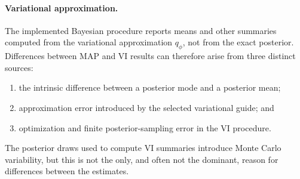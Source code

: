 \paragraph{Variational approximation.}
The implemented Bayesian procedure reports means and other summaries computed from
the variational approximation $q_\phi$, not from the exact posterior. Differences
between MAP and VI results can therefore arise from three distinct sources:
\begin{enumerate}
\item the intrinsic difference between a posterior mode and a posterior mean;
\item approximation error introduced by the selected variational guide; and
\item optimization and finite posterior-sampling error in the VI procedure.
\end{enumerate}
The posterior draws used to compute VI summaries introduce Monte Carlo variability,
but this is not the only, and often not the dominant, reason for differences between
the estimates.


